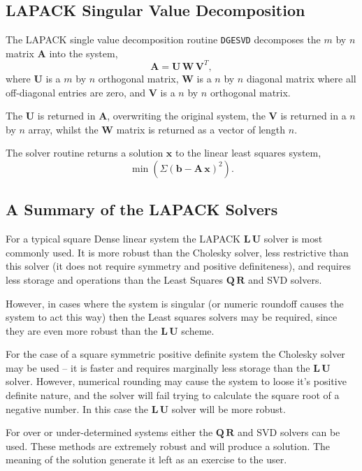 \subsection{LAPACK Singular Value Decomposition}\label{s2.4}

The LAPACK single value decomposition routine {\tt DGESVD} decomposes the 
$m$ by $n$ matrix $\mathbf{A}$ into the system,
\begin{equation}\label{e2.4.1}
\mathbf{A} = \mathbf{U} \, \mathbf{W} \,\mathbf{V}^T,
\end{equation}
where $\mathbf{U}$ is a $m$ by $n$ orthogonal matrix, 
$\mathbf{W}$ is a $n$ by $n$ diagonal matrix where all off-diagonal entries
are zero, and $\mathbf{V}$ is a $n$ by $n$ orthogonal matrix.

The $\mathbf{U}$ is returned in $\mathbf{A}$, overwriting the original system,
the $\mathbf{V}$ is returned in a $n$ by $n$ array, whilst the $\mathbf{W}$
matrix is returned as a vector of length $n$.

The solver routine returns a solution $\mathbf{x}$ to the linear least squares
system,
\begin{equation}\label{e2.4.2}
\min \left( 
       \Sigma \left( \mathbf{b} - \mathbf{A} \, \mathbf{x} \right)^2 
     \right).
\end{equation}


\subsection{A Summary of the LAPACK Solvers}\label{s2.5}

For a typical square Dense linear system the LAPACK $\mathbf{L \, U}$ solver
is most commonly used. It is more robust than the Cholesky solver, less 
restrictive than this solver (it does not require symmetry and positive 
definiteness), and requires less storage and operations than the Least 
Squares $\mathbf{Q \, R}$ and SVD solvers.

However, in cases where the system is singular (or numeric roundoff causes the
system to act this way) then the Least squares solvers may be required, since
they are even more robust than the $\mathbf{L \, U}$ scheme.

For the case of a square symmetric positive definite system the Cholesky 
solver may be used -- it is faster and requires marginally less storage 
than the $\mathbf{L \, U}$ solver. However, numerical rounding may cause 
the system to loose it's positive definite nature, and the solver will 
fail trying to calculate the square root of a negative number. In this case
the $\mathbf{L \, U}$ solver will be more robust.

For over or under-determined systems either the $\mathbf{Q \, R}$ and SVD
solvers can be used. These methods are extremely robust and will produce a 
solution. The meaning of the solution generate it left as an exercise to the 
user.


